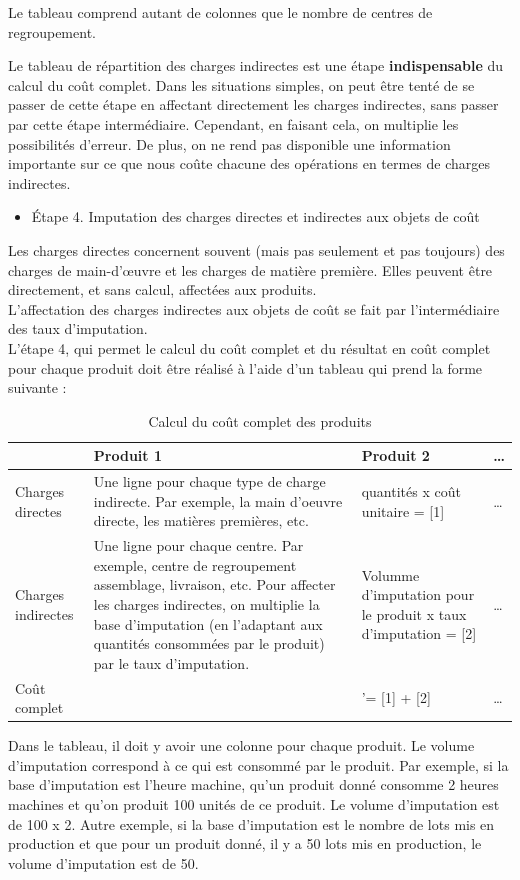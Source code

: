 \documentclass{tufte-handout}
\begin{document}
\begin{enumerate}
Le tableau comprend autant de colonnes que le nombre de centres de regroupement.\\
\begin{warning}
Le tableau de répartition des charges indirectes est une étape \textbf{indispensable} du calcul du coût complet. Dans les situations simples, on peut être tenté de se passer de cette étape en affectant directement les charges indirectes, sans passer par cette étape intermédiaire. Cependant, en faisant cela, on multiplie les possibilités d'erreur. De plus, on ne rend pas disponible une information importante sur ce que nous coûte chacune des opérations en termes de charges indirectes.\\
\end{warning}
\begin{itemize}
\item Étape 4. Imputation des charges directes et indirectes aux objets de coût\\
\end{itemize}
Les charges directes concernent souvent (mais pas seulement et pas toujours) des charges de main-d'œuvre et les charges de matière première. Elles peuvent être directement, et sans calcul, affectées aux produits.\\
L'affectation des charges indirectes aux objets de coût se fait par l'intermédiaire des taux d'imputation.\\
L'étape 4, qui permet le calcul du coût complet et du résultat en coût complet pour chaque produit doit être réalisé à l'aide d'un tableau qui prend la forme suivante :\\
\begin{table}[htbp]
\caption{Calcul du coût complet des produits}
\centering
\begin{tabular}{llll}
 & Produit 1 & Produit 2 & \ldots{}\\
\hline
Charges directes & Une ligne pour chaque type de charge indirecte. Par exemple, la main d'oeuvre directe, les matières premières, etc. & quantités x coût unitaire = [1] & \ldots{}\\
Charges indirectes & Une ligne pour chaque centre. Par exemple, centre de regroupement assemblage, livraison, etc. Pour affecter les charges indirectes, on multiplie la base d'imputation (en l'adaptant aux quantités consommées par le produit) par le taux d'imputation. & Volumme d'imputation pour le produit x taux d'imputation = [2] & \ldots{}\\
Coût complet &  & '= [1] + [2] & \ldots{}\\
\end{tabular}
\end{table}
Dans le tableau, il doit y avoir une colonne pour chaque produit. Le volume d'imputation correspond à ce qui est consommé par le produit. Par exemple, si la base d'imputation est l'heure machine, qu'un produit donné consomme 2 heures machines et qu'on produit 100 unités de ce produit. Le volume d'imputation est de 100 x 2. Autre exemple, si la base d'imputation est le nombre de lots mis en production et que pour un produit donné, il y a 50 lots mis en production, le volume d'imputation est de 50.\\


\end{enumerate}
\end{document}
